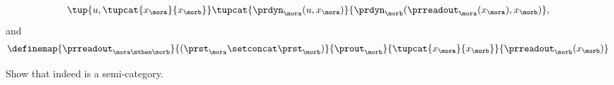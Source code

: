 \begin{definition}[\Moore]
\begin{enumerate}
\begin{equation}
{        }{
          \tup{u, \tupcat{x_{\mora}}{x_{\morb}}}
        }{
          \tupcat{ \prdyn_{\mora} (u, x_{\mora})}{\prdyn_{\morb}(\prreadout_{\mora}(x_{\mora}), x_{\morb})},
        }
    \end{equation}
    and
    \begin{equation}
      \definemap{
        \prreadout_{\mora\mthen\morb}
        }{
          (\prst_{\mora} \setconcat \prst_{\morb})
        }{
          \prout_{\morb}
        }{
          \tupcat{x_{\mora}}{x_{\morb}}
        }{
          \prreadout_{\morb}(x_{\morb})
        }
    \end{equation}
  \end{enumerate}
\end{definition}

\begin{exercise}
  Show that indeed \Moore is a semi-category.
\end{exercise}
